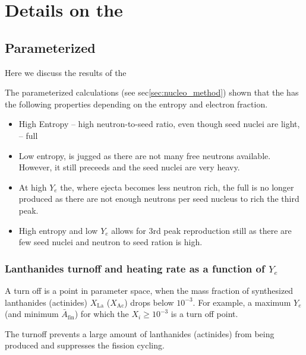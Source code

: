 
\chapter{Details on the \rproc{} \nuc{}}
\label{app:nuc}

\section{Parameterized \rproc{}}

Here we discuss the results of the \citet{Lippuner:2015gwa}

The parameterized calculations (see sec\ref{sec:nucleo_method}) shown that 
the \rproc{} \nuc{} has the following properties depending on the entropy and electron fraction.

\begin{itemize}
    \item High Entropy -- high neutron-to-seed ratio, even though seed nuclei are light, -- full \rproc{}
    \item Low entropy, \rproc{} is jugged as there are not many free neutrons available. However, it still preceeds and the seed nuclei are very heavy.
    \item At high $Y_e$ the, where ejecta becomes less neutron rich, the full \rproc{} is no longer produced as there are not enough neutrons per seed nucleus to rich the third peak.
    \item High entropy and low $Y_e$ allows for $3$rd peak reproduction still as there are few seed nuclei and neutron to seed ration is high.
\end{itemize}


\subsection{Lanthanides turnoff and heating rate as a function of $Y_e$}

A turn off is a point in parameter space, when the mass fraction of synthesized lanthanides (actinides) $X_{\text{La}}$ ($X_{\text{Ac}}$) drops below $10^{-3}$. For example, a maximum $Y_e$ (and minimum $\bar{A}_{\text{fin}}$) for which the $X_i \geq 10^{-3}$ is a turn off point. 

The turnoff prevents a large amount of lanthanides (actinides) from being produced and suppresses the fission cycling.

